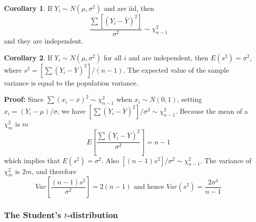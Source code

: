 \documentclass{article}
\begin{document}
\textbf{Corollary 1}. If \(Y_i\sim N(\mu,\sigma^2)\) and are iid, then
\begin{equation*}
    \frac{\sum[(Y_i-\overline{Y})^2]}{\sigma^2}\sim\chi_{n-1}^2
\end{equation*}
and they are independent.

\textbf{Corollary 2}. If \(Y_i\sim N(\mu,\sigma^2)\) for all \(i\) and are independent, then \(E(s^2)=\sigma^2\), where \(s^2=\left[\sum(Y_i-\overline{Y})^2\right]/(n-1)\). The expected value of the sample variance is equal to the population variance.

\textbf{Proof:} Since \(\sum(x_i-\overline{x})^2\sim\chi_{n-1}^2\) when \(x_i\sim N(0,1)\), setting \(x_i=(Y_i-\mu)/\sigma\), we have \([\sum(Y_i-\overline{Y})^2]/\sigma^2\sim\chi_{n-1}^2\). Because the mean of a \(\chi_m^2 \text{ is } m\)
\begin{equation*}
    E\left[\frac{\sum(Y_i-\overline{Y})^2}{\sigma^2}\right]=n-1
\end{equation*}
which implies that \(E(s^2)=\sigma^2\). Also \([(n-1)s^2]/\sigma^2\sim\chi_{n-1}^2\). The variance of \(\chi_m^2\) is \(2m\), and therefore
\begin{equation*}
    Var\left[\frac{(n-1)s^2}{\sigma^2}\right]=2(n-1) \text{ and hence } Var(s^2)=\frac{2\sigma^4}{n-1}
\end{equation*}

\subsubsection{The Student's \(t\)-distribution}
\end{document}
